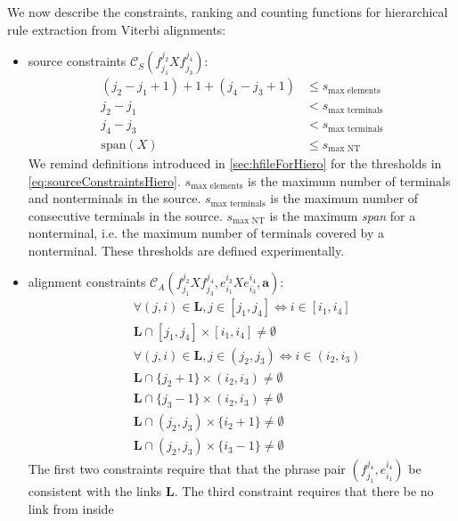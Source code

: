 We now describe the constraints, ranking and counting functions for
hierarchical rule extraction from Viterbi alignments:
%
\begin{itemize}
  \item source constraints $\mathcal{C}_S(f_{j_1}^{j_2} X f_{j_3}^{j_4})$:
%
\begin{equation}
  \begin{split}
    (j_2 - j_1 + 1) + 1 + (j_4 - j_3 + 1) &\leq s_{\text{max elements}} \\
    j_2 - j_1 &< s_{\text{max terminals}} \\
    j_4 - j_3 &< s_{\text{max terminals}} \\
    \text{span}(X) &\leq s_\text{max NT}
  \end{split}
  \label{eq:sourceConstraintsHiero}
\end{equation}
%
We remind definitions introduced
in \autoref{sec:hfileForHiero} for the thresholds in
\autoref{eq:sourceConstraintsHiero}.
$s_{\text{max elements}}$ is the maximum number of terminals and nonterminals
in the source. $s_{\text{max terminals}}$ is the maximum number of consecutive
terminals in the source. $s_{\text{max NT}}$ is the maximum \emph{span}
for a nonterminal, i.e. the maximum number of
terminals covered by a nonterminal. These thresholds are defined
experimentally.
  \item alignment constraints $\mathcal{C}_A(f_{j_1}^{j_2} X f_{j_3}^{j_4}, e_{i_1}^{i_2} X e_{i_3}^{i_4}, \bm{a})$:
\begin{equation}
\begin{split}
  & \forall (j,i) \in \bm{L}, j \in [j_1, j_4] \Leftrightarrow i \in [i_1,i_4] \\
  & \bm{L} \cap [j_1, j_4] \times [i_1, i_4] \neq \emptyset \\
  & \forall (j,i) \in \bm{L}, j \in (j_2, j_3) \Leftrightarrow i \in (i_2, i_3) \\
  & \bm{L} \cap \{j_2 + 1\} \times (i_2, i_3) \neq \emptyset \\
  & \bm{L} \cap \{j_3 - 1\} \times (i_2, i_3) \neq \emptyset \\
  & \bm{L} \cap (j_2, j_3) \times \{i_2 + 1\} \neq \emptyset \\
  & \bm{L} \cap (j_2, j_3) \times \{i_3 - 1\} \neq \emptyset
\end{split}
\end{equation}
%
The first two constraints require that that the phrase pair
$(f_{j_1}^{j_4}, e_{i_1}^{i_4})$ be consistent with the links $\bm{L}$.
The third constraint requires that there be no link from inside

\end{itemize}
